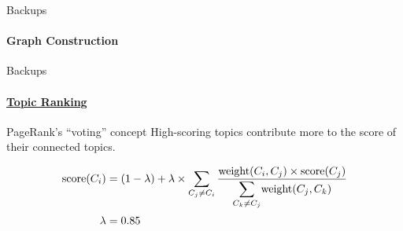   \begin{frame}[label=graph_construction_backup]{Backups}
    \framesubtitle{Graph Construction}

  \end{frame}

  \begin{frame}[label=topic_ranking_backup]{Backups}
    \framesubtitle{\hyperlink{topicrank}{Topic Ranking}}

    \begin{block}{PageRank's ``voting'' concept}
      High-scoring topics contribute more to the score of their connected
      topics.
    \end{block}

    \begin{align}
      \text{score}(C_i) &= (1 - \lambda) + \lambda \times \sum_{C_j \neq C_i} \frac{\text{weight}(C_i, C_j) \times \text{score}(C_j)}{\mathlarger{\sum}_{C_k \neq C_j} \text{weight}(C_j, C_k)} \notag\\
      \lambda &= 0.85 \notag
    \end{align}
  \end{frame}

